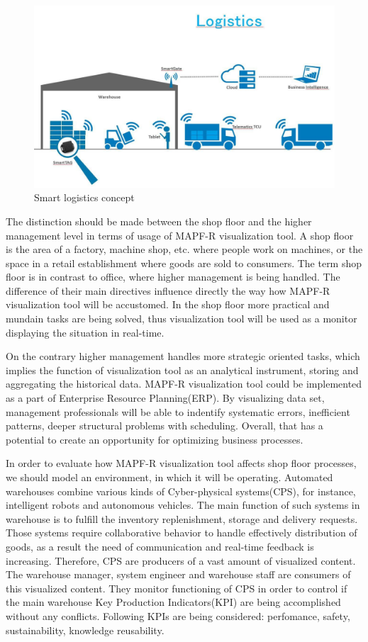 \documentclass[thesis=B,english]{FITthesis}[2019/12/23]
\begin{document}
\begin{figure}
	\includegraphics[scale=0.4]{smartlogistics.jpg}
	\caption[Smart logistics]{Smart logistics concept}\label{fig:float27}
\end{figure}

The distinction should be made between the shop floor and the higher management level in terms of usage of MAPF-R visualization tool. A shop floor is the area of a factory, machine shop, etc. where people work on machines, or the space in a retail establishment where goods are sold to consumers. The term shop floor is in contrast to office, where higher management is being handled. The difference of their main directives influence directly the way how MAPF-R visualization tool will be accustomed. In the shop floor more practical and mundain tasks are being solved, thus visualization tool will be used as a monitor displaying the situation in real-time. 

On the contrary higher management handles more strategic oriented tasks, which implies the function of visualization tool as an analytical instrument, storing and aggregating the historical data. MAPF-R visualization tool could be implemented as a part of Enterprise Resource Planning(ERP). By visualizing data set, management professionals will be able to indentify systematic errors, inefficient patterns, deeper structural problems with scheduling. Overall, that has a potential to create an opportunity for optimizing business processes.

In order to evaluate how MAPF-R visualization tool affects shop floor processes, we should model an environment, in which it will be operating. Automated warehouses combine various kinds of Cyber-physical systems(CPS), for instance, intelligent robots and autonomous vehicles. The main function of such systems in warehouse is to fulfill the inventory replenishment, storage and delivery requests. Those systems require collaborative behavior to handle effectively distribution of goods, as a result the need of communication and real-time feedback is increasing. Therefore, CPS are producers of a vast amount of visualized content. The warehouse manager, system engineer and warehouse staff are consumers of this visualized content. They monitor functioning of CPS in order to control if the main warehouse Key Production Indicators(KPI) are being accomplished without any conflicts. Following KPIs are being considered: perfomance, safety, sustainability, knowledge reusability.
\end{document}
